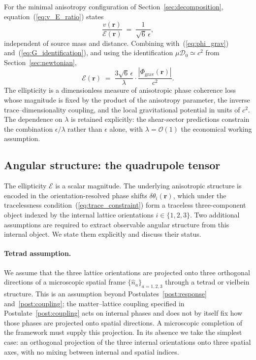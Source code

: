 \documentclass[a4paper,fleqn]{cas-dc}
\theoremstyle{thmstyleone}%
\theoremstyle{thmstyletwo}%
\begin{document}
For the minimal anisotropy configuration of
Section~\ref{sec:decomposition},
equation~(\ref{eq:v_E_ratio}) states
\begin{equation}
    \frac{v(\mathbf{r})}{\mathcal{E}(\mathbf{r})}
    \;=\;
    \frac{1}{\sqrt{6}\,\epsilon},
    \label{eq:ratio_restate}
\end{equation}
independent of source mass and distance. Combining
with~(\ref{eq:phi_grav}) and~(\ref{eq:G_identification}), and
using the identification $\mu\mathcal{D}_0\simeq c^2$ from
Section~\ref{sec:newtonian},
\begin{equation}
    \mathcal{E}(\mathbf{r})
    \;=\;
    \frac{3\sqrt{6}\,\epsilon}{\lambda}\cdot
    \frac{|\Phi_{\mathrm{grav}}(\mathbf{r})|}{c^2}.
    \label{eq:E_from_Phi}
\end{equation}
The ellipticity is a dimensionless measure of anisotropic
phase coherence loss whose magnitude is fixed by the product
of the anisotropy parameter, the inverse trace--dimensionality
coupling, and the local gravitational potential in units of
$c^2$. The dependence on $\lambda$ is retained explicitly: the
shear-sector predictions constrain the combination
$\epsilon/\lambda$ rather than $\epsilon$ alone, with
$\lambda=\mathcal{O}(1)$ the economical working assumption.

\subsection{Angular structure: the quadrupole tensor}
\label{sec:quadrupole}

The ellipticity $\mathcal{E}$ is a scalar magnitude. The
underlying anisotropic structure is encoded in the
orientation-resolved phase shifts
$\delta\theta_i(\mathbf{r})$, which under the tracelessness
condition~(\ref{eq:trace_constraint}) form a traceless
three-component object indexed by the internal lattice
orientations $i\in\{1,2,3\}$. Two additional assumptions are
required to extract observable angular structure from this
internal object. We state them explicitly and discuss their
status.

\paragraph{Tetrad assumption.}
We assume that the three lattice orientations are projected
onto three orthogonal directions of a microscopic spatial
frame $\{\hat{n}_a\}_{a=1,2,3}$ through a tetrad or vielbein
structure. This is an assumption beyond
Postulates~\ref{post:response} and~\ref{post:coupling}; the
matter--lattice coupling specified in
Postulate~\ref{post:coupling} acts on internal phases and does
not by itself fix how those phases are projected onto
spatial directions. A microscopic completion of the framework
must supply this projection. In its absence we take the
simplest case: an orthogonal projection of the three internal
orientations onto three spatial axes, with no mixing between
internal and spatial indices.
\end{document}
